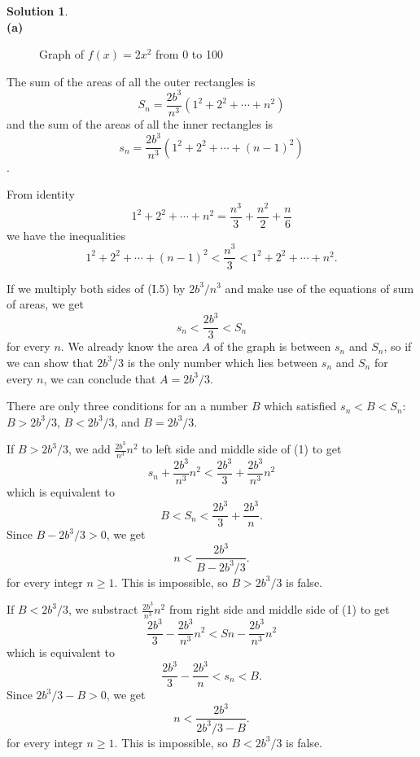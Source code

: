 \documentclass[11pt,a4paper]{book}
\theoremstyle{definition}
\newtheorem{solution}{Solution}
\begin{document}
\begin{solution}{\ \\}
  \textbf{(a)}
  \begin{figure}[H]
    \centering
    \caption*{Graph of $f(x)=2x^2$ from 0 to 100}
  \end{figure}
  The sum of the areas of all the outer rectangles is
  \[
  S_n = \frac{2b^3}{n^3} \left( 1^2 + 2^2 + \cdots + n^2 \right) 
  \]
  and the sum of the areas of all the inner rectangles is
  \[
  s_n = \frac{2b^3}{n^3} \left( 1^2 + 2^2 + \cdots + (n-1)^2 \right)
  \].

  From identity
  \[
  \tag{I.3} 1^2 + 2^2 + \cdots + n^2 = \frac{n^3}{3} + \frac{n^2}{2} + \frac{n}{6}
  \]
  we have the inequalities
  \[
  \tag{I.5} 1^2 + 2^2 + \cdots + (n-1)^2 < \frac{n^3}{3} < 1^2 + 2^2 + \cdots + n^2.
  \]

  
  If we multiply both sides of (I.5) by $2b^3/n^3$ and make use of the equations of sum of areas, we get
  \[
  s_n < \frac{2b^3}{3} < S_n \tag{1}
  \]
  for every $n$. We already know the area $A$ of the graph is between $s_n$ and $S_n$, so if we can 
  show that $2b^3/3$ is the only number which lies between $s_n$ and $S_n$ for every $n$, we can conclude that $A = 2b^3/3$.

  There are only three conditions for an a number $B$ which satisfied $s_n < B < S_n$: $B > 2b^3/3$, $B < 2b^3/3$, and $B = 2b^3/3$.

  If $B > 2b^3/3$, we add $\frac{2b^3}{n^3}n^2$ to left side and middle side of (1) to get
  \[
  s_n + \frac{2b^3}{n^3}n^2 < \frac{2b^3}{3} + \frac{2b^3}{n^3}n^2
  \]
  which is equivalent to
  \[
  B < S_n < \frac{2b^3}{3} + \frac{2b^3}{n}.
  \]
  Since $B - 2b^3/3 > 0$, we get
  \[
  n < \frac{2b^3}{B - 2b^3/3}.
  \]
  for every integr $n \ge 1$. This is impossible, so $B > 2b^3/3$ is false.

  If $B < 2b^3/3$, we substract $\frac{2b^3}{n^3}n^2$ from right side and middle side of (1) to get
  \[
  \frac{2b^3}{3} - \frac{2b^3}{n^3}n^2 < Sn - \frac{2b^3}{n^3}n^2
  \]
  which is equivalent to
  \[
  \frac{2b^3}{3} - \frac{2b^3}{n} < s_n < B.
  \]
  Since $2b^3/3 - B > 0$, we get
  \[
  n < \frac{2b^3}{2b^3/3 - B}.
  \]
  for every integr $n \ge 1$. This is impossible, so $B < 2b^3/3$ is false.


\end{solution}
\end{document}
